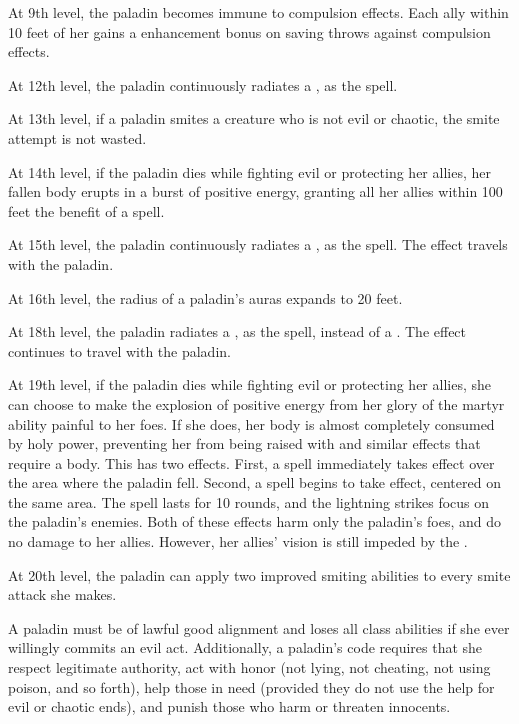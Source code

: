  At 9th level, the paladin becomes immune to compulsion effects. Each ally within 10 feet of her gains a  enhancement bonus on saving throws against compulsion effects.

 At 12th level, the paladin continuously radiates a , as the spell.

 At 13th level, if a paladin smites a creature who is not evil or chaotic, the smite attempt is not wasted.

 At 14th level, if the paladin dies while fighting evil or protecting her allies, her fallen body erupts in a burst of positive energy, granting all her allies within 100 feet the benefit of a  spell.

 At 15th level, the paladin continuously radiates a , as the spell. The effect travels with the paladin.

 At 16th level, the radius of a paladin's auras expands to 20 feet.

 At 18th level, the paladin radiates a , as the spell, instead of a . The effect continues to travel with the paladin.

 At 19th level, if the paladin dies while fighting evil or protecting her allies, she can choose to make the explosion of positive energy from her glory of the martyr ability painful to her foes. If she does, her body is almost completely consumed by holy power, preventing her from being raised with  and similar effects that require a body. This has two effects. First, a  spell immediately takes effect over the area where the paladin fell. Second, a  spell begins to take effect, centered on the same area. The spell lasts for 10 rounds, and the lightning strikes focus on the paladin's enemies. Both of these effects harm only the paladin's foes, and do no damage to her allies. However, her allies' vision is still impeded by the .

 At 20th level, the paladin can apply two improved smiting abilities to every smite attack she makes.

 A paladin must be of lawful good alignment
and loses all class abilities if she ever willingly commits an evil act.
Additionally, a paladin's code requires that she respect legitimate
authority, act with honor (not lying, not cheating, not using poison,
and so forth), help those in need (provided they do not use the help
for evil or chaotic ends), and punish those who harm or threaten
innocents.

